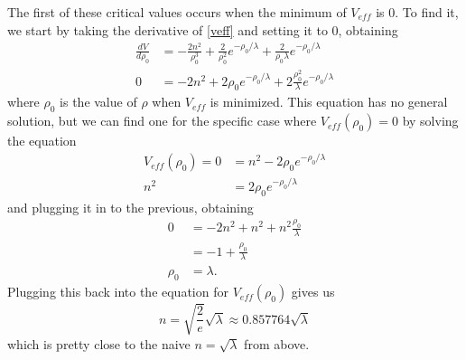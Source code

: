 \documentclass[12pt,twoside]{reedthesis}
\begin{document}
The first of these critical values occurs when the minimum of $V_{eff}$ is 0. To find it, we start by taking the derivative of \eqref{veff} and setting it to 0, obtaining
\begin{align}
\frac{dV}{d\rho_0} &= -\frac{2n^2}{\rho_0^3} + \frac{2}{\rho_0^2}e^{-\rho_0/\lambda} + \frac{2}{\rho_0 \lambda} e^{-\rho_0/\lambda} \\
0 &= -2n^2 + 2\rho_0 e^{-\rho_0/\lambda} + 2\frac{\rho_0^2}{\lambda} e^{-\rho_0/\lambda}
\label{vmin}
\end{align}
where $\rho_0$ is the value of $\rho$ when $V_{eff}$ is minimized. This equation has no general solution, but we can find one for the specific case where $V_{eff}(\rho_0) = 0$ by solving the equation
\begin{align}
V_{eff}(\rho_0)=0 &= n^2 - 2\rho_0 e^{-\rho_0/\lambda} \\
n^2 &= 2 \rho_0 e^{-\rho_0/\lambda}
\end{align}
and plugging it in to the previous, obtaining
\begin{align}
0 &= -2n^2 + n^2 +n^2 \frac{\rho_0}{\lambda} \\
&= -1 + \frac{\rho_0}{\lambda} \\
\rho_0 &= \lambda \mbox{.}
\end{align}
Plugging this back into the equation for $V_{eff}(\rho_0)$ gives us
\begin{equation}
\mbox{$n = \sqrt{\frac{2}{e}}\sqrt{\lambda} \approx 0.857764\sqrt{\lambda}$}
\end{equation}
which is pretty close to the naive $n = \sqrt{\lambda}$ from above. 
\end{document}
